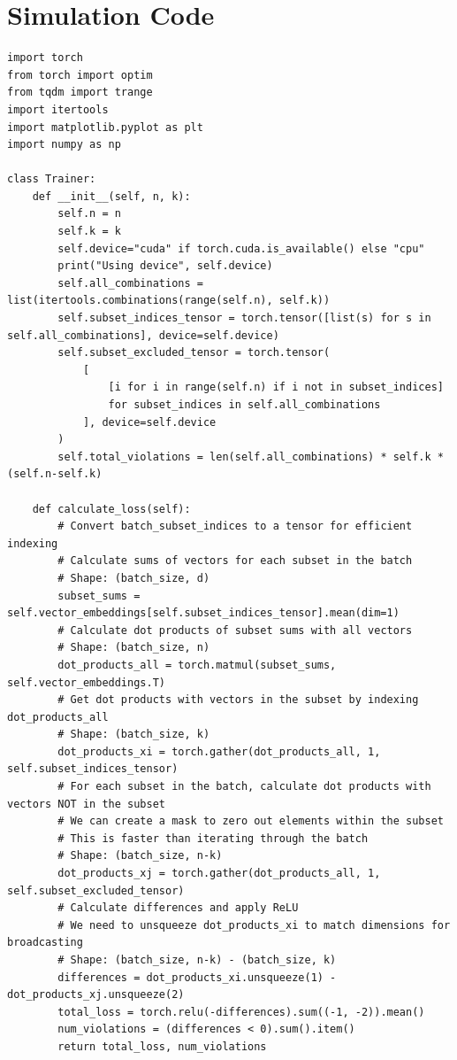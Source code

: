 \section{Simulation Code}\label{app:code}

\begin{lstlisting}
import torch
from torch import optim
from tqdm import trange
import itertools
import matplotlib.pyplot as plt
import numpy as np

class Trainer:
    def __init__(self, n, k):
        self.n = n
        self.k = k
        self.device="cuda" if torch.cuda.is_available() else "cpu"
        print("Using device", self.device)
        self.all_combinations = list(itertools.combinations(range(self.n), self.k))
        self.subset_indices_tensor = torch.tensor([list(s) for s in self.all_combinations], device=self.device)
        self.subset_excluded_tensor = torch.tensor(
            [
                [i for i in range(self.n) if i not in subset_indices]
                for subset_indices in self.all_combinations
            ], device=self.device
        )
        self.total_violations = len(self.all_combinations) * self.k * (self.n-self.k)

    def calculate_loss(self):
        # Convert batch_subset_indices to a tensor for efficient indexing
        # Calculate sums of vectors for each subset in the batch
        # Shape: (batch_size, d)
        subset_sums = self.vector_embeddings[self.subset_indices_tensor].mean(dim=1)
        # Calculate dot products of subset sums with all vectors
        # Shape: (batch_size, n)
        dot_products_all = torch.matmul(subset_sums, self.vector_embeddings.T)
        # Get dot products with vectors in the subset by indexing dot_products_all
        # Shape: (batch_size, k)
        dot_products_xi = torch.gather(dot_products_all, 1, self.subset_indices_tensor)
        # For each subset in the batch, calculate dot products with vectors NOT in the subset
        # We can create a mask to zero out elements within the subset
        # This is faster than iterating through the batch
        # Shape: (batch_size, n-k)
        dot_products_xj = torch.gather(dot_products_all, 1, self.subset_excluded_tensor)
        # Calculate differences and apply ReLU
        # We need to unsqueeze dot_products_xi to match dimensions for broadcasting
        # Shape: (batch_size, n-k) - (batch_size, k)
        differences = dot_products_xi.unsqueeze(1) - dot_products_xj.unsqueeze(2)
        total_loss = torch.relu(-differences).sum((-1, -2)).mean()
        num_violations = (differences < 0).sum().item()
        return total_loss, num_violations



\end{lstlisting}
